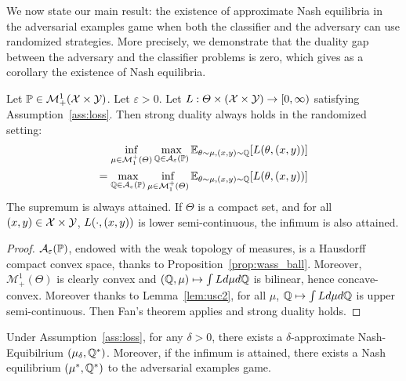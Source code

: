 
We now state our main result: the existence of approximate Nash equilibria in the adversarial examples game when both the classifier and the adversary can use randomized strategies. More precisely, we demonstrate that the duality gap between the adversary and the classifier problems is zero, which gives as a corollary the existence of Nash equilibria. 

\begin{thm}
\label{thm:duality-rand}
Let $\mathbb{P}\in\mathcal{M}^1_+(\mathcal{X}\times\mathcal{Y})$. Let $\varepsilon>0$. Let $L:\Theta\times(\mathcal{X}\times\mathcal{Y})\to [0,\infty)$ satisfying Assumption~\ref{ass:loss}. %
Then strong duality always holds in the randomized  setting:
\begin{align}
 \label{eq:duality}\inf_{\mu\in \mathcal{M}^+_1(\Theta)} \max_{\QQ\in \mathcal{A}_{\varepsilon}(\PP)} \mathbb{E}_{\theta \sim \mu, (x,y)\sim\QQ }\left[\loss(\theta,(x,y))\right]\\
=
\nonumber\max_{\QQ\in \mathcal{A}_{\varepsilon}(\PP)}\inf_{\mu\in \mathcal{M}^+_1(\Theta)}  \mathbb{E}_{\theta \sim \mu, (x,y)\sim\QQ }\left[\loss(\theta,(x,y))\right]
\end{align}
The supremum is always attained. If $\Theta$ is a compact set, and for all $(x,y)\in\mathcal{X}\times\mathcal{Y}$, $L(\cdot,(x,y))$ is lower semi-continuous, the infimum is also attained.
\end{thm}


\begin{proof}
$\mathcal{A}_\varepsilon(\mathbb{P})$, endowed with the weak topology of measures, is a Hausdorff compact convex space, thanks to Proposition~\ref{prop:wass_ball}. Moreover, $\mathcal{M}^1_+(\Theta)$ is clearly convex and $(\mathbb{Q},\mu)\mapsto \int L d\mu d\mathbb{Q}$ is bilinear, hence concave-convex. Moreover thanks to Lemma~\ref{lem:usc2}, for all $\mu$, $\mathbb{Q}\mapsto \int L d\mu d\mathbb{Q}$ is upper semi-continuous. Then Fan's theorem applies and strong duality holds.
\end{proof}
 \begin{corollary}
\label{cor:nash-eq}
Under Assumption~\ref{ass:loss}, for any $\delta>0$, there exists a $\delta$-approximate Nash-Equibilrium $(\mu_\delta,\mathbb{Q}^*)$. Moreover, if the infimum is attained, there exists a Nash equilibrium $(\mu^*,\mathbb{Q}^*)$ to the adversarial examples game.
\end{corollary}



